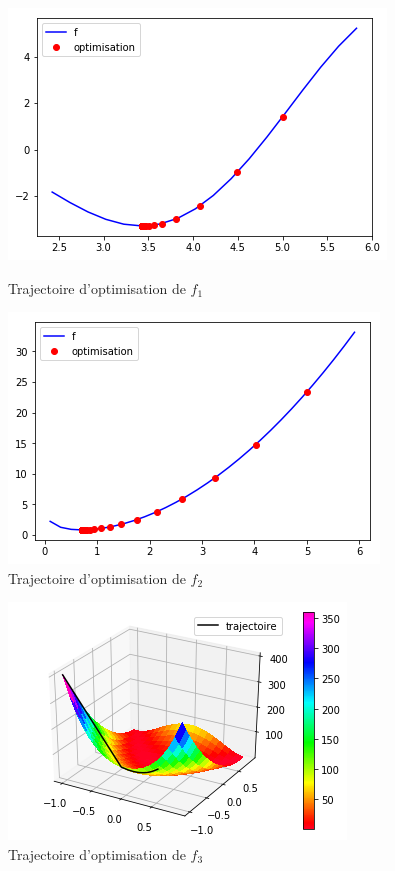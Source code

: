 \documentclass[a4paper]{article}
\begin{document}
\begin{figure}[ht!]
\begin{center}
\begin{minipage}{0.45\textwidth}
\includegraphics[scale=0.5]{f1_trajectoire.png}
\caption{Trajectoire d'optimisation de $f_1$}
\label{f1_trajectoire}
\end{minipage}\hfill
\begin{minipage}{0.45\textwidth}
\includegraphics[scale=0.5]{f2_trajectoire.png}
\caption{Trajectoire d'optimisation de $f_2$}
\label{f2_trajectoire}
\end{minipage}
\end{center}
\end{figure}

\begin{figure}[ht!]
\begin{center}
\includegraphics[scale=0.5]{f3_trajectoire.png}
\caption{Trajectoire d'optimisation de $f_3$}
\label{f3_trajectoire}
\end{center}
\end{figure}
\end{document}
